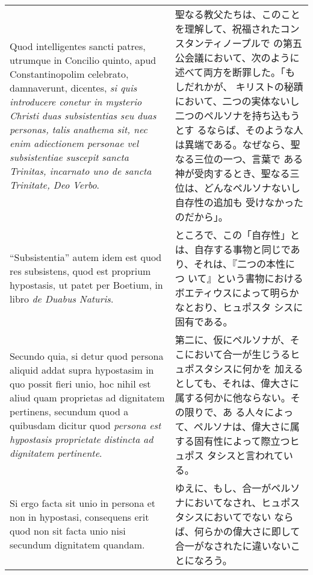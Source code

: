 \documentclass[10pt]{jsarticle} %
\begin{document}
\begin{longtable}{p{21em}p{21em}}
\\


 Quod intelligentes
sancti patres, utrumque in Concilio quinto, apud Constantinopolim
celebrato, damnaverunt, dicentes, {\itshape si quis introducere conetur in
mysterio Christi duas subsistentias seu duas personas, talis anathema
sit, nec enim adiectionem personae vel subsistentiae suscepit sancta
Trinitas, incarnato uno de sancta Trinitate, Deo Verbo}. 


&

聖なる教父たちは、このことを理解して、祝福されたコンスタンティノープルで
 の第五公会議において、次のように述べて両方を断罪した。「もしだれかが、
 キリストの秘蹟において、二つの実体ないし二つのペルソナを持ち込もうとす
 るならば、そのような人は異端である。なぜなら、聖なる三位の一つ、言葉で
 ある神が受肉するとき、聖なる三位は、どんなペルソナないし自存性の追加も
 受けなかったのだから」。

\\


``Subsistentia''
autem idem est quod res subsistens, quod est proprium hypostasis, ut
patet per Boetium, in libro {\itshape de Duabus Naturis}. 



&

ところで、この「自存性」とは、自存する事物と同じであり、それは、『二つの本性につ
 いて』という書物におけるボエティウスによって明らかなとおり、ヒュポスタ
 シスに固有である。


\\

Secundo quia, si detur
quod persona aliquid addat supra hypostasim in quo possit fieri unio,
hoc nihil est aliud quam proprietas ad dignitatem pertinens, secundum
quod a quibusdam dicitur quod {\itshape persona est hypostasis proprietate
distincta ad dignitatem pertinente}. 



&

第二に、仮にペルソナが、そこにおいて合一が生じうるヒュポスタシスに何かを
 加えるとしても、それは、偉大さに属する何かに他ならない。その限りで、あ
 る人々によって、ペルソナは、偉大さに属する固有性によって際立つヒュポス
 タシスと言われている。


\\

Si ergo facta sit unio in persona et
non in hypostasi, consequens erit quod non sit facta unio nisi secundum
dignitatem quandam. 


&

ゆえに、もし、合一がペルソナにおいてなされ、ヒュポスタシスにおいてでない
 ならば、何らかの偉大さに即して合一がなされたに違いないことになろう。



\end{longtable}
\end{document}
